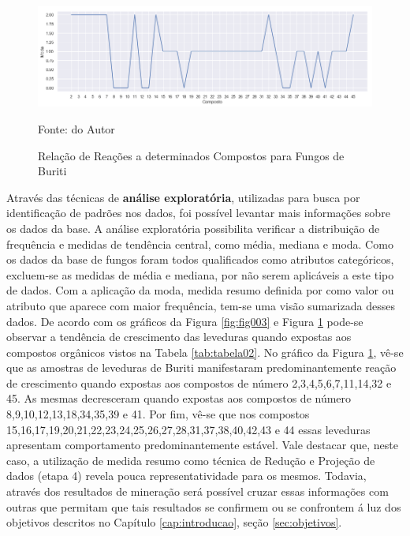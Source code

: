 \documentclass[tcc2]{classe_uftex/uftex}
\begin{document}
        \begin{figure}[hbt]
        \centering
          \includegraphics[scale=0.5]{TCC_Johnny/img/Buriti_Moda-reacaoComposto.png}
          \caption{Relação de Reações a determinados Compostos para Fungos de Buriti}
          \footnotesize{Fonte: do Autor}
          \label{fig:fig004}
        \end{figure}
    
    Através das técnicas de \textbf{análise exploratória}, utilizadas para busca por identificação de padrões nos dados, foi possível levantar mais informações sobre os dados da base. A análise exploratória possibilita verificar a distribuição de frequência e medidas de tendência central, como média, mediana e moda. Como os dados da base de fungos foram todos qualificados como atributos categóricos, excluem-se as medidas de média e mediana, por não serem aplicáveis a este tipo de dados. Com a aplicação da moda, medida resumo definida por  como valor ou atributo que aparece com maior frequência, tem-se uma visão sumarizada desses dados. De acordo com os gráficos da Figura \ref{fig:fig003} e Figura \ref{fig:fig004} pode-se observar a tendência de crescimento das leveduras quando expostas aos compostos orgânicos vistos na Tabela \ref{tab:tabela02}. No gráfico da Figura \ref{fig:fig004}, vê-se que as amostras de leveduras de Buriti manifestaram predominantemente reação de crescimento quando expostas aos compostos de número 2,3,4,5,6,7,11,14,32 e 45. As mesmas decresceram quando expostas aos compostos de número 8,9,10,12,13,18,34,35,39 e 41. Por fim, vê-se que nos compostos 15,16,17,19,20,21,22,23,24,25,26,27,28,31,37,38,40,42,43 e 44 essas leveduras apresentam comportamento predominantemente estável. Vale destacar que, neste caso, a utilização de medida resumo como técnica de Redução e Projeção de dados (etapa 4) revela pouca representatividade para os mesmos. Todavia, através dos resultados de mineração será possível cruzar essas informações com outras que permitam que tais resultados se confirmem ou se confrontem á luz dos objetivos descritos no Capítulo \ref{cap:introducao}, seção \ref{sec:objetivos}.
    
\end{document}
